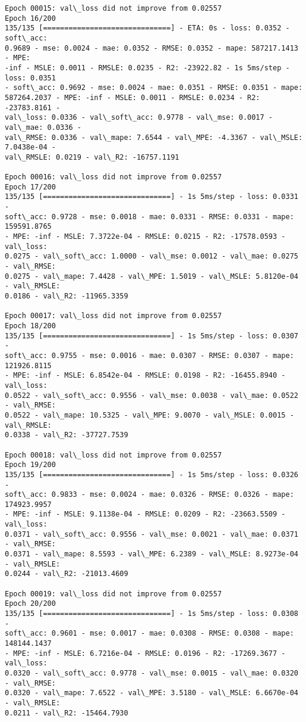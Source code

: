 \documentclass[11pt]{article}
\begin{document}
\begin{Verbatim}[commandchars=\\\{\}]
Epoch 00015: val\_loss did not improve from 0.02557
Epoch 16/200
135/135 [==============================] - ETA: 0s - loss: 0.0352 - soft\_acc:
0.9689 - mse: 0.0024 - mae: 0.0352 - RMSE: 0.0352 - mape: 587217.1413 - MPE:
-inf - MSLE: 0.0011 - RMSLE: 0.0235 - R2: -23922.82 - 1s 5ms/step - loss: 0.0351
- soft\_acc: 0.9692 - mse: 0.0024 - mae: 0.0351 - RMSE: 0.0351 - mape:
587264.2037 - MPE: -inf - MSLE: 0.0011 - RMSLE: 0.0234 - R2: -23783.8161 -
val\_loss: 0.0336 - val\_soft\_acc: 0.9778 - val\_mse: 0.0017 - val\_mae: 0.0336 -
val\_RMSE: 0.0336 - val\_mape: 7.6544 - val\_MPE: -4.3367 - val\_MSLE: 7.0438e-04 -
val\_RMSLE: 0.0219 - val\_R2: -16757.1191

Epoch 00016: val\_loss did not improve from 0.02557
Epoch 17/200
135/135 [==============================] - 1s 5ms/step - loss: 0.0331 -
soft\_acc: 0.9728 - mse: 0.0018 - mae: 0.0331 - RMSE: 0.0331 - mape: 159591.8765
- MPE: -inf - MSLE: 7.3722e-04 - RMSLE: 0.0215 - R2: -17578.0593 - val\_loss:
0.0275 - val\_soft\_acc: 1.0000 - val\_mse: 0.0012 - val\_mae: 0.0275 - val\_RMSE:
0.0275 - val\_mape: 7.4428 - val\_MPE: 1.5019 - val\_MSLE: 5.8120e-04 - val\_RMSLE:
0.0186 - val\_R2: -11965.3359

Epoch 00017: val\_loss did not improve from 0.02557
Epoch 18/200
135/135 [==============================] - 1s 5ms/step - loss: 0.0307 -
soft\_acc: 0.9755 - mse: 0.0016 - mae: 0.0307 - RMSE: 0.0307 - mape: 121926.8115
- MPE: -inf - MSLE: 6.8542e-04 - RMSLE: 0.0198 - R2: -16455.8940 - val\_loss:
0.0522 - val\_soft\_acc: 0.9556 - val\_mse: 0.0038 - val\_mae: 0.0522 - val\_RMSE:
0.0522 - val\_mape: 10.5325 - val\_MPE: 9.0070 - val\_MSLE: 0.0015 - val\_RMSLE:
0.0338 - val\_R2: -37727.7539

Epoch 00018: val\_loss did not improve from 0.02557
Epoch 19/200
135/135 [==============================] - 1s 5ms/step - loss: 0.0326 -
soft\_acc: 0.9833 - mse: 0.0024 - mae: 0.0326 - RMSE: 0.0326 - mape: 174923.9957
- MPE: -inf - MSLE: 9.1138e-04 - RMSLE: 0.0209 - R2: -23663.5509 - val\_loss:
0.0371 - val\_soft\_acc: 0.9556 - val\_mse: 0.0021 - val\_mae: 0.0371 - val\_RMSE:
0.0371 - val\_mape: 8.5593 - val\_MPE: 6.2389 - val\_MSLE: 8.9273e-04 - val\_RMSLE:
0.0244 - val\_R2: -21013.4609

Epoch 00019: val\_loss did not improve from 0.02557
Epoch 20/200
135/135 [==============================] - 1s 5ms/step - loss: 0.0308 -
soft\_acc: 0.9601 - mse: 0.0017 - mae: 0.0308 - RMSE: 0.0308 - mape: 148144.1437
- MPE: -inf - MSLE: 6.7216e-04 - RMSLE: 0.0196 - R2: -17269.3677 - val\_loss:
0.0320 - val\_soft\_acc: 0.9778 - val\_mse: 0.0015 - val\_mae: 0.0320 - val\_RMSE:
0.0320 - val\_mape: 7.6522 - val\_MPE: 3.5180 - val\_MSLE: 6.6670e-04 - val\_RMSLE:
0.0211 - val\_R2: -15464.7930


\end{Verbatim}
\end{document}
